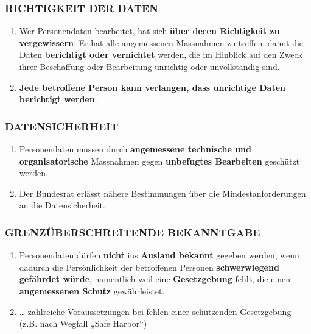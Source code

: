 \hypertarget{richtigkeit-der-daten}{%
\subsubsection{RICHTIGKEIT DER DATEN}\label{richtigkeit-der-daten}}

\begin{enumerate}
\def\labelenumi{\arabic{enumi}.}
\tightlist
\item
  Wer Personendaten bearbeitet, hat sich \textbf{über deren Richtigkeit
  zu vergewissern}. Er hat alle angemessenen Massnahmen zu treffen,
  damit die Daten \textbf{berichtigt oder vernichtet} werden, die im
  Hinblick auf den Zweck ihrer Beschaffung oder Bearbeitung unrichtig
  oder unvollständig sind.
\item
  \textbf{Jede betroffene Person kann verlangen, dass unrichtige Daten
  berichtigt werden}.
\end{enumerate}

\hypertarget{datensicherheit}{%
\subsubsection{DATENSICHERHEIT}\label{datensicherheit}}

\begin{enumerate}
\def\labelenumi{\arabic{enumi}.}
\tightlist
\item
  Personendaten müssen durch \textbf{angemessene technische und
  organisatorische} Massnahmen gegen \textbf{unbefugtes Bearbeiten}
  geschützt werden.
\item
  Der Bundesrat erlässt nähere Bestimmungen über die
  Mindestanforderungen an die Datensicherheit.
\end{enumerate}

\hypertarget{grenzuxfcberschreitende-bekanntgabe}{%
\subsubsection{GRENZÜBERSCHREITENDE
BEKANNTGABE}\label{grenzuxfcberschreitende-bekanntgabe}}

\begin{enumerate}
\def\labelenumi{\arabic{enumi}.}
\item
  Personendaten dürfen \textbf{nicht} ins \textbf{Ausland bekannt}
  gegeben werden, wenn dadurch die Persönlichkeit der betroffenen
  Personen \textbf{schwerwiegend gefährdet würde}, namentlich weil eine
  \textbf{Gesetzgebung} fehlt, die einen \textbf{angemessenen Schutz}
  gewährleistet.
\item
  \ldots{} zahlreiche Voraussetzungen bei fehlen einer schützenden
  Gesetzgebung (z.B. nach Wegfall „Safe Harbor``)
\end{enumerate}

